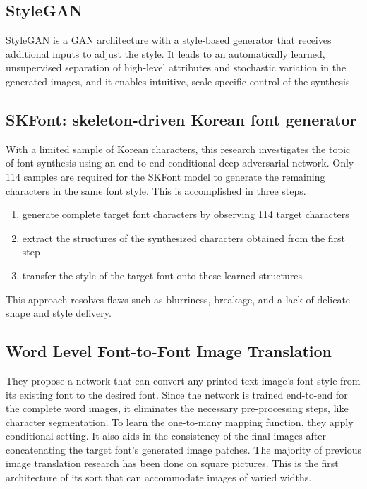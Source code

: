 \documentclass[letterpaper]{article}
\begin{document}
\subsection{StyleGAN}
StyleGAN is a GAN architecture with a style-based generator that receives additional inputs to adjust the style. It leads to an automatically learned, unsupervised separation of high-level attributes and stochastic variation in the generated images, and it enables intuitive, scale-specific control of the synthesis.

\subsection{SKFont: skeleton-driven Korean font generator}
With a limited sample of Korean characters, this research investigates the topic of font synthesis using an end-to-end conditional deep adversarial network. Only 114 samples are required for the SKFont model to generate the remaining characters in the same font style. This is accomplished in three steps.

\begin{enumerate}
\item generate complete target font characters by observing 114 target characters
\item extract the structures of the synthesized characters obtained from the first step
\item transfer the style of the target font onto these learned structures
\end{enumerate}
This approach resolves flaws such as blurriness, breakage, and a lack of delicate shape and style delivery.


\subsection{Word Level Font-to-Font Image Translation}
They propose a network that can convert any printed text image's font style from its existing font to the desired font. Since the network is trained end-to-end for the complete word images, it eliminates the necessary pre-processing steps, like character segmentation. To learn the one-to-many mapping function, they apply conditional setting. It also aids in the consistency of the final images after concatenating the target font's generated image patches. The majority of previous image translation research has been done on square pictures. This is the first architecture of its sort that can accommodate images of varied widths.
\end{document}
